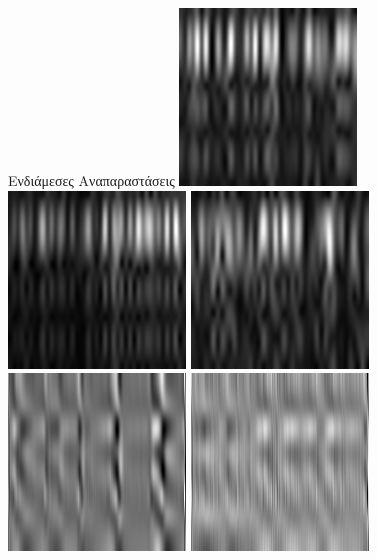 \documentclass{beamer}
\begin{document}
\begin{frame}[c]{Ενδιάμεσες Αναπαραστάσεις}
	\includegraphics[scale=0.26]{spectrogram_healthy_area.png}
	\includegraphics[scale=0.26]{spectrogram_tumor_area.png}
	\includegraphics[scale=0.26]{spectrogram_epilepsy.png}
	\\
	\includegraphics[scale=0.26]{cnn_eyes_open.png}
	\includegraphics[scale=0.26]{cnn_eyes_closed.png}

\end{frame}
\end{document}
